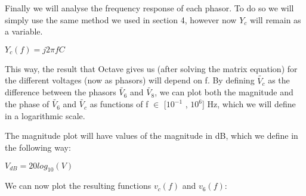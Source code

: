 Finally we will analyse the frequency response of each phasor. To do so we will simply use the same method we used in section 4, however now $Y_c$ will remain as a variable.

$Y_c(f)=j2\pi fC$

This way, the result that Octave gives us (after solving the matrix equation) for the different voltages (now as phasors) will depend on f.
By defining $\widetilde{V_c}$ as the difference between the phasors $\widetilde{V_6}$ and $\widetilde{V_8}$, we can plot both the magnitude and the phase of $\widetilde{V_6}$ and $\widetilde{V_c}$ as functions of f $\in$ [$10^{-1}$ , $10^6$] Hz, which we will define in a logarithmic scale.

\vspace{20pt}

The magnitude plot will have values of the magnitude in dB, which we define in the following way:

\vspace{20pt}

$V_{dB} = 20log_{10}(V)$

\vspace{20pt}

We can now plot the resulting functions $v_c(f)$ and $v_6(f)$:


\begin{figure}[h!]
	\centering
	\label{fig:fr}
\end{figure}








\newpage
